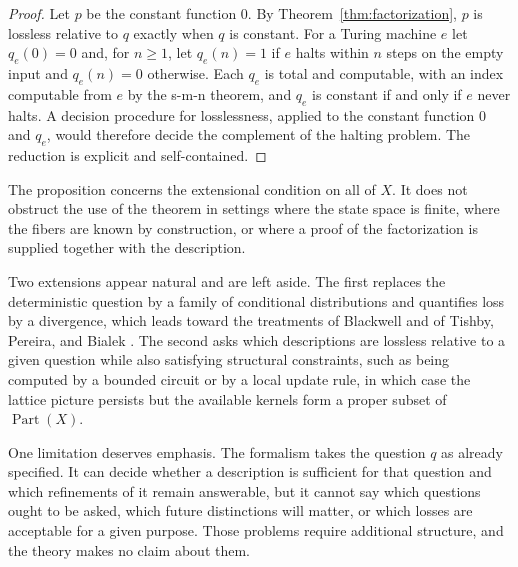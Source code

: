 \documentclass[11pt]{article}
\theoremstyle{definition}
\theoremstyle{remark}
\newcommand{\Part}{\operatorname{Part}}
\begin{document}
\begin{proof}
Let $p$ be the constant function $0$. By Theorem~\ref{thm:factorization}, $p$ is lossless relative to $q$ exactly when $q$ is constant. For a Turing machine $e$ let $q_e(0)=0$ and, for $n\ge1$, let $q_e(n)=1$ if $e$ halts within $n$ steps on the empty input and $q_e(n)=0$ otherwise. Each $q_e$ is total and computable, with an index computable from $e$ by the s-m-n theorem, and $q_e$ is constant if and only if $e$ never halts. A decision procedure for losslessness, applied to the constant function $0$ and $q_e$, would therefore decide the complement of the halting problem. The reduction is explicit and self-contained.
\end{proof}

The proposition concerns the extensional condition on all of $X$. It does not obstruct the use of the theorem in settings where the state space is finite, where the fibers are known by construction, or where a proof of the factorization is supplied together with the description.

Two extensions appear natural and are left aside. The first replaces the deterministic question by a family of conditional distributions and quantifies loss by a divergence, which leads toward the treatments of Blackwell \cite{blackwell} and of Tishby, Pereira, and Bialek \cite{tishby}. The second asks which descriptions are lossless relative to a given question while also satisfying structural constraints, such as being computed by a bounded circuit or by a local update rule, in which case the lattice picture persists but the available kernels form a proper subset of $\Part(X)$.

One limitation deserves emphasis. The formalism takes the question $q$ as already specified. It can decide whether a description is sufficient for that question and which refinements of it remain answerable, but it cannot say which questions ought to be asked, which future distinctions will matter, or which losses are acceptable for a given purpose. Those problems require additional structure, and the theory makes no claim about them.
\end{document}
